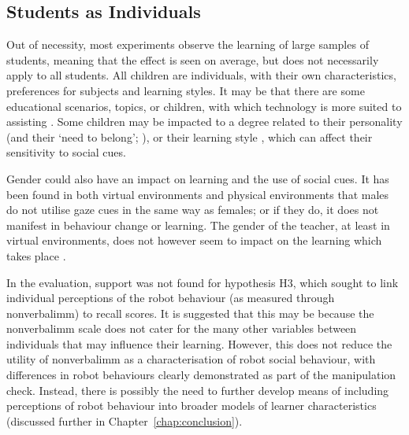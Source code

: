 \subsection{Students as Individuals} \label{sec:individuals}
Out of necessity, most experiments observe the learning of large samples of students, meaning that the effect is seen on average, but does not necessarily apply to all students. All children are individuals, with their own characteristics, preferences for subjects and learning styles. It may be that there are some educational scenarios, topics, or children, with which technology is more suited to assisting \citep{dede2009immersive}. Some children may be impacted to a degree related to their personality (and their `need to belong'; \citealp{pickett2004getting}), or their learning style \citep{witkin1977field}, which can affect their sensitivity to social cues.

Gender could also have an impact on learning and the use of social cues. It has been found in both virtual environments \citep{bailenson2001equilibrium, bailenson2003interpersonal, bailenson2005transformed} and physical environments \citep{bull1981influences} that males do not utilise gaze cues in the same way as females; or if they do, it does not manifest in behaviour change or learning. The gender of the teacher, at least in virtual environments, does not however seem to impact on the learning which takes place \citep{baylor2004pedagogical}.

In the evaluation, support was not found for hypothesis H3, which sought to link individual perceptions of the robot behaviour (as measured through \gls{nonverbalimm}) to recall scores. It is suggested that this may be because the \gls{nonverbalimm} scale does not cater for the many other variables between individuals that may influence their learning. However, this does not reduce the utility of \gls{nonverbalimm} as a characterisation of robot social behaviour, with differences in robot behaviours clearly demonstrated as part of the manipulation check. Instead, there is possibly the need to further develop means of including perceptions of robot behaviour into broader models of learner characteristics (discussed further in Chapter~\ref{chap:conclusion}).

